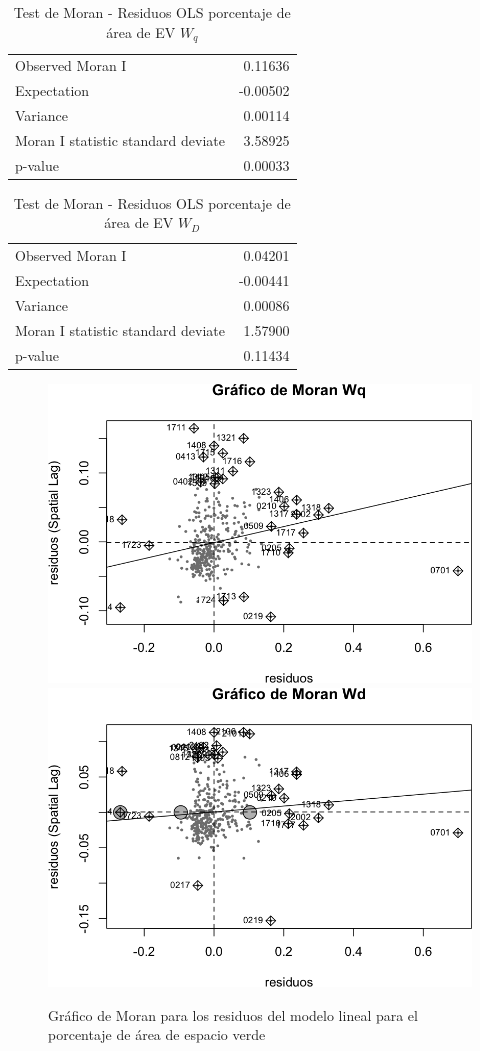 \documentclass[12pt,]{book}
\begin{document}
\begin{table}

\caption{\label{tab:moran-resareaep-wq}Test de Moran - Residuos OLS porcentaje de área de EV $W_q$}
\centering
\begin{tabular}[t]{lr}
\toprule
  &  \\
\midrule
Observed Moran I & 0.11636\\
Expectation & -0.00502\\
Variance & 0.00114\\
Moran I statistic standard deviate & 3.58925\\
p-value & 0.00033\\
\bottomrule
\end{tabular}
\end{table}

\begin{table}

\caption{\label{tab:moran-resareaep-wd}Test de Moran - Residuos OLS porcentaje de área de EV $W_D$}
\centering
\begin{tabular}[t]{lr}
\toprule
  &  \\
\midrule
Observed Moran I & 0.04201\\
Expectation & -0.00441\\
Variance & 0.00086\\
Moran I statistic standard deviate & 1.57900\\
p-value & 0.11434\\
\bottomrule
\end{tabular}
\end{table}

\begin{figure}
\includegraphics[width=0.49\linewidth]{tesis-unigis_files/figure-latex/moranplot-resareaep-w-1} \includegraphics[width=0.49\linewidth]{tesis-unigis_files/figure-latex/moranplot-resareaep-w-2} \caption{Gráfico de Moran para los residuos del modelo lineal para el porcentaje de área de espacio verde}\label{fig:moranplot-resareaep-w}
\end{figure}
\end{document}
